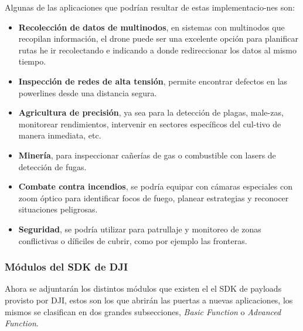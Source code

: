 \documentclass[12pt]{article}
\begin{document}
Algunas de las aplicaciones que podrían resultar de estas implementacio-nes son:
\begin{itemize}
  \item \textbf{Recolección de datos de multinodos}, en sistemas con multinodos que recopilan información, el drone puede ser una excelente opción para planificar rutas he ir recolectando e indicando a donde redireccionar los datos al mismo tiempo.
  \item \textbf{Inspección de redes de alta tensión}, permite encontrar defectos en las powerlines desde una distancia segura.
  \item \textbf{Agricultura de precisión}, ya sea para la detección de plagas, male-zas, monitorear rendimientos, intervenir en sectores específicos del cul-tivo de manera inmediata, etc.
  \item \textbf{Minería}, para inspeccionar cañerías de gas o combustible con lasers de detección de fugas.
  \item \textbf{Combate contra incendios}, se podría equipar con cámaras especiales con zoom óptico para identificar focos de fuego, planear estrategias y reconocer situaciones peligrosas.
  \item \textbf{Seguridad}, se podría utilizar para patrullaje y monitoreo de zonas conflictivas o díficiles de cubrir, como por ejemplo las fronteras.
\end{itemize}

\subsubsection{Módulos del SDK de DJI}
Ahora se adjuntarán los distintos módulos que existen el el SDK de payloads provisto por DJI, estos son los que abrirán las puertas a nuevas aplicaciones, los mismos se clasifican en dos grandes subsecciones, \textit{Basic Function} o \textit{Advanced Function}.
\end{document}
